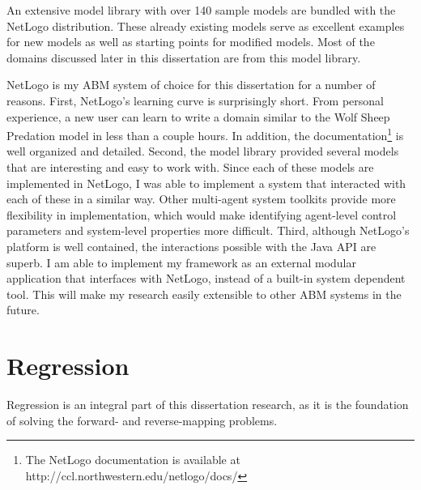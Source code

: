 An extensive model library with over 140 sample models are bundled with the NetLogo distribution.
These already existing models serve as excellent examples for new models as well as starting points for modified models.
Most of the domains discussed later in this dissertation are from this model library.

NetLogo is my ABM system of choice for this dissertation for a number of reasons.
First, NetLogo's learning curve is surprisingly short.
From personal experience, a new user can learn to write a domain similar to the Wolf Sheep Predation model in less than a couple hours.
In addition, the documentation\footnote{The NetLogo documentation is available at http://ccl.northwestern.edu/netlogo/docs/} is well organized and detailed.
Second, the model library provided several models that are interesting and easy to work with.
Since each of these models are implemented in NetLogo, I was able to implement a system that interacted with each of these in a similar way.
Other multi-agent system toolkits provide more flexibility in implementation, which would make identifying agent-level control parameters and system-level properties more difficult.
Third, although NetLogo's platform is well contained, the interactions possible with the Java API are superb.
I am able to implement my framework as an external modular application that interfaces with NetLogo, instead of a built-in system dependent tool.
This will make my research easily extensible to other ABM systems in the future.



\section{Regression}
Regression is an integral part of this dissertation research, as it is the foundation of solving the forward- and reverse-mapping problems.


